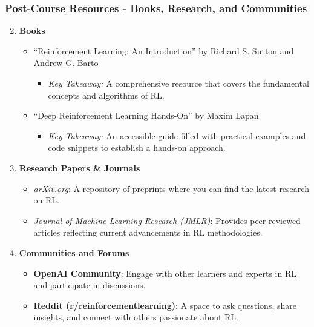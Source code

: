 \documentclass[aspectratio=169]{beamer}
\begin{document}
\begin{frame}[fragile]
    \frametitle{Post-Course Resources - Books, Research, and Communities}
    \begin{enumerate}
        \setcounter{enumi}{1} %
        \item \textbf{Books}
        \begin{itemize}
            \item ``Reinforcement Learning: An Introduction'' by Richard S. Sutton and Andrew G. Barto
                \begin{itemize}
                    \item \textit{Key Takeaway:} A comprehensive resource that covers the fundamental concepts and algorithms of RL.
                \end{itemize}
            \item ``Deep Reinforcement Learning Hands-On'' by Maxim Lapan
                \begin{itemize}
                    \item \textit{Key Takeaway:} An accessible guide filled with practical examples and code snippets to establish a hands-on approach.
                \end{itemize}
        \end{itemize}

        \item \textbf{Research Papers \& Journals}
        \begin{itemize}
            \item \textit{arXiv.org}: A repository of preprints where you can find the latest research on RL.
            \item \textit{Journal of Machine Learning Research (JMLR)}: Provides peer-reviewed articles reflecting current advancements in RL methodologies.
        \end{itemize}

        \item \textbf{Communities and Forums}
        \begin{itemize}
            \item \textbf{OpenAI Community}: Engage with other learners and experts in RL and participate in discussions.
            \item \textbf{Reddit (r/reinforcementlearning)}: A space to ask questions, share insights, and connect with others passionate about RL.
        \end{itemize}
    \end{enumerate}
\end{frame}
\end{document}
